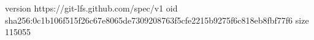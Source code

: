version https://git-lfs.github.com/spec/v1
oid sha256:0c1b106f515f26c67e8065de7309208763f5cfe2215b9275f6c818eb8fbf77f6
size 115055
